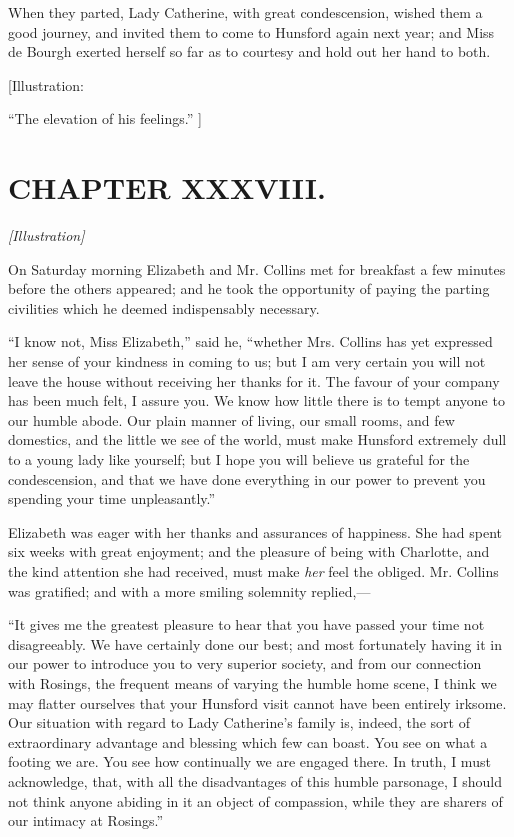 \documentclass[12pt]{book}
\begin{document}
When they parted, Lady Catherine, with great condescension, wished them a good journey, and invited them to come to Hunsford again next year; and Miss de Bourgh exerted herself so far as to courtesy and hold out her hand to both.

[Illustration:

``The elevation of his feelings.'' ]

\chapter{CHAPTER XXXVIII.}

\emph{[Illustration]}

On Saturday morning Elizabeth and Mr. Collins met for breakfast a few minutes before the others appeared; and he took the opportunity of paying the parting civilities which he deemed indispensably necessary.

``I know not, Miss Elizabeth,'' said he, ``whether Mrs. Collins has yet expressed her sense of your kindness in coming to us; but I am very certain you will not leave the house without receiving her thanks for it. The favour of your company has been much felt, I assure you. We know how little there is to tempt anyone to our humble abode. Our plain manner of living, our small rooms, and few domestics, and the little we see of the world, must make Hunsford extremely dull to a young lady like yourself; but I hope you will believe us grateful for the condescension, and that we have done everything in our power to prevent you spending your time unpleasantly.''

Elizabeth was eager with her thanks and assurances of happiness. She had spent six weeks with great enjoyment; and the pleasure of being with Charlotte, and the kind attention she had received, must make \textit{her} feel the obliged. Mr. Collins was gratified; and with a more smiling solemnity replied,---

``It gives me the greatest pleasure to hear that you have passed your time not disagreeably. We have certainly done our best; and most fortunately having it in our power to introduce you to very superior society, and from our connection with Rosings, the frequent means of varying the humble home scene, I think we may flatter ourselves that your Hunsford visit cannot have been entirely irksome. Our situation with regard to Lady Catherine's family is, indeed, the sort of extraordinary advantage and blessing which few can boast. You see on what a footing we are. You see how continually we are engaged there. In truth, I must acknowledge, that, with all the disadvantages of this humble parsonage, I should not think anyone abiding in it an object of compassion, while they are sharers of our intimacy at Rosings.''
\end{document}
